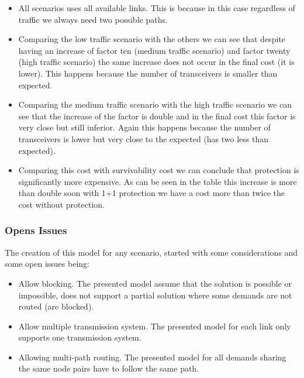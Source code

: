 \begin{itemize}
  \item All scenarios uses all available links. This is because in this case regardless of traffic we always need two possible paths.
  \item Comparing the low traffic scenario with the others we can see that despite having an increase of factor ten (medium traffic scenario) and factor twenty (high traffic scenario) the same increase does not occur in the final cost (it is lower). This happens because the number of transceivers is smaller than expected.
  \item Comparing the medium traffic scenario with the high traffic scenario we can see that the increase of the factor is double and in the final cost this factor is very close but still inferior. Again this happens because the number of transceivers is lower but very close to the expected (has two less than expected).
  \item Comparing this cost with survivability cost we can conclude that protection is significantly more expensive. As can be seen in the table this increase is more than double soon with 1+1 protection we have a cost more than twice the cost without protection.
\end{itemize}

\vspace{13pt}
\subsubsection{Opens Issues}

The creation of this model for any scenario, started with some considerations and some open issues being:

\begin{itemize}
  \item Allow blocking.
  \subitem The presented model assume that the solution is possible or impossible, does not support a partial solution where some demands are not routed (are blocked).
  \item Allow multiple transmission system.
  \subitem The presented model for each link only supports one transmission system.
  \item Allowing multi-path routing.
  \subitem The presented model for all demands sharing the same node pairs have to follow the same path.
\end{itemize}


